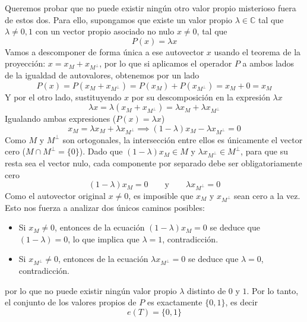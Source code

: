 \begin{ejercicio}
\begin{itemize}
    \end{itemize}
    Queremos probar que no puede existir ningún otro valor propio misterioso fuera de estos dos. Para ello, supongamos que existe un valor propio $\lambda \in \mathbb{C}$ tal que $\lambda\neq 0,1$ con un vector propio asociado no nulo $x \neq 0$, tal que
    $$P(x) = \lambda x$$
    Vamos a descomponer de forma única a ese autovector $x$ usando el teorema de la proyección: $x = x_M + x_{M^\perp}$, por lo que si aplicamos el operador $P$ a ambos lados de la igualdad de autovalores, obtenemos por un lado
    $$P(x) = P(x_M + x_{M^\perp}) = P(x_M) + P(x_{M^\perp}) = x_M + 0 = x_M$$
    Y por el otro lado, sustituyendo $x$ por su descomposición en la expresión $\lambda x$
    $$\lambda x = \lambda (x_M + x_{M^\perp}) = \lambda x_M + \lambda x_{M^\perp}$$
    Igualando ambas expresiones ($P(x) = \lambda x$)
    $$x_M = \lambda x_M + \lambda x_{M^\perp} \implies (1 - \lambda)x_M - \lambda x_{M^\perp} = 0$$
    Como $M$ y $M^\perp$ son ortogonales, la intersección entre ellos es únicamente el vector cero (\mbox{$M \cap M^\perp = \{0\}$}). Dado que $(1 - \lambda)x_M \in M$ y $\lambda x_{M^\perp} \in M^\perp$, para que su resta sea el vector nulo, cada componente por separado debe ser obligatoriamente cero
    \begin{equation*}
        (1 - \lambda)x_M = 0 \qquad \text{y} \qquad \lambda x_{M^\perp} = 0
    \end{equation*}
    Como el autovector original $x \neq 0$, es imposible que $x_M$ y $x_{M^\perp}$ sean cero a la vez. Esto nos fuerza a analizar dos únicos caminos posibles:
    \begin{itemize}
        \item Si $x_M \neq 0$, entonces de la ecuación $(1 - \lambda)x_M = 0$ se deduce que $(1 - \lambda) = 0$, lo que implica que $\lambda = 1$, contradicción.
        \item Si $x_{M^\perp} \neq 0$, entonces de la ecuación $\lambda x_{M^\perp} = 0$ se deduce que $\lambda = 0$, contradicción.
    \end{itemize}
    por lo que no puede existir ningún valor propio $\lambda$ distinto de $0$ y $1$. Por lo tanto, el conjunto de los valores propios de $P$ es exactamente $\{0,1\}$, es decir
    \begin{equation*}
        e(T)=\{0,1\}
    \end{equation*}
\end{ejercicio}


